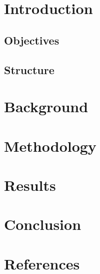 \documentclass[12pt]{article}
\begin{document}
\newpage

\tableofcontents
\newpage

\section{Introduction}
\subsection{Objectives}
\subsection{Structure}
\section{Background}
\section{Methodology}
\section{Results}
\section{Conclusion}
\section{References}
\end{document}
